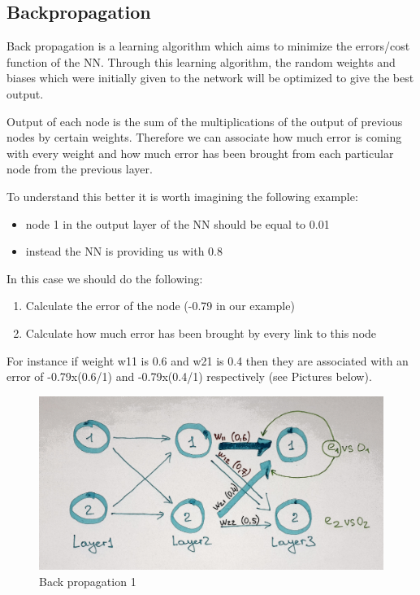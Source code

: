 \subsection{Backpropagation}

Back propagation is a learning algorithm which aims to minimize the errors/cost function of the NN. Through this learning algorithm, the random weights and biases which were initially given to the network will be optimized to give the best output.

Output of each node is the sum of the multiplications of the output of previous nodes by certain weights. Therefore we can associate how much error is coming with every weight and how much error has been brought from each particular node from the previous layer.

To understand this better it is worth imagining the following example:
\begin{itemize}
   \item  node 1 in the output layer of the NN should be equal to 0.01
   \item  instead the NN is providing us with 0.8
\end{itemize}

In this case we should do the following:
\begin{enumerate}
   \item Calculate the error of the node (-0.79 in our example)
   \item Calculate how much error has been brought by every link to this node
\end{enumerate}

For instance if weight w11 is 0.6 and w21 is 0.4 then they are associated with an error of -0.79x(0.6/1) and -0.79x(0.4/1) respectively (see Pictures below).

\begin{figure}[H]
    \includegraphics[width=\linewidth]{pics/bp.jpg}
    \caption{\label{fig:bp1} Back propagation 1}
\end{figure}


